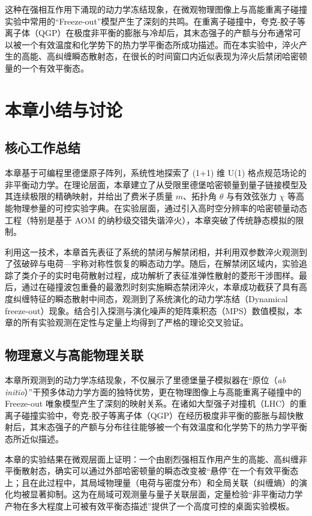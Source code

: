 \documentclass[../main.tex]{subfiles}
\begin{document}
这种在强相互作用下涌现的动力学冻结现象，在微观物理图像上与高能重离子碰撞实验中常用的“Freeze-out”模型产生了深刻的共鸣。在重离子碰撞中，夸克-胶子等离子体（QGP）在极度非平衡的膨胀与冷却后，其末态强子的产额与分布通常可以被一个有效温度和化学势下的热力学平衡态所成功描述。而在本实验中，淬火产生的高能、高纠缠瞬态散射态，在很长的时间窗口内近似表现为淬火后禁闭哈密顿量的一个有效平衡态。


\section{本章小结与讨论}

\subsection{核心工作总结}
本章基于可编程里德堡原子阵列，系统性地探索了 (1+1) 维 U(1) 格点规范场论的非平衡动力学。在理论层面，本章建立了从受限里德堡哈密顿量到量子链接模型及其连续极限的精确映射，并给出了费米子质量 $m$、拓扑角 $\theta$ 与有效弦张力 $\chi$ 等高能物理参量的可控实验字典。在实验层面，通过引入高时空分辨率的哈密顿量动态工程（特别是基于 AOM 的纳秒级交错失谐淬火），本章突破了传统静态模拟的限制。

利用这一技术，本章首先表征了系统的禁闭与解禁闭相，并利用双参数淬火观测到了弦破碎与电荷—宇称对称性恢复的瞬态动力学。随后，在解禁闭区域内，实验追踪了类介子的实时电荷散射过程，成功解析了表征准弹性散射的菱形干涉图样。最后，通过在碰撞波包重叠的最激烈时刻实施瞬态禁闭淬火，本章成功截获了具有高度纠缠特征的瞬态散射中间态，观测到了系统演化的动力学冻结（Dynamical freeze-out）现象。结合引入探测与演化噪声的矩阵乘积态（MPS）数值模拟，本章的所有实验观测在定性与定量上均得到了严格的理论交叉验证。

\subsection{物理意义与高能物理关联}
本章所观测到的动力学冻结现象，不仅展示了里德堡量子模拟器在“原位（\textit{ab initio}）”干预多体动力学方面的独特优势，更在物理图像上与高能重离子碰撞中的 Freeze-out 唯象模型产生了深刻的映射关系。在诸如大型强子对撞机（LHC）的重离子碰撞实验中，夸克-胶子等离子体（QGP）在经历极度非平衡的膨胀与超快散射后，其末态强子的产额与分布往往能够被一个有效温度和化学势下的热力学平衡态所近似描述。

本章的实验结果在微观层面上证明：一个由剧烈强相互作用产生的高能、高纠缠非平衡散射态，确实可以通过外部哈密顿量的瞬态改变被“悬停”在一个有效平衡态上；且在此过程中，其局域物理量（电荷与密度分布）和全局关联（纠缠熵）的演化均被显著抑制。这为在局域可观测量与量子关联层面，定量检验“非平衡动力学产物在多大程度上可被有效平衡态描述”提供了一个高度可控的桌面实验模板。
\end{document}
